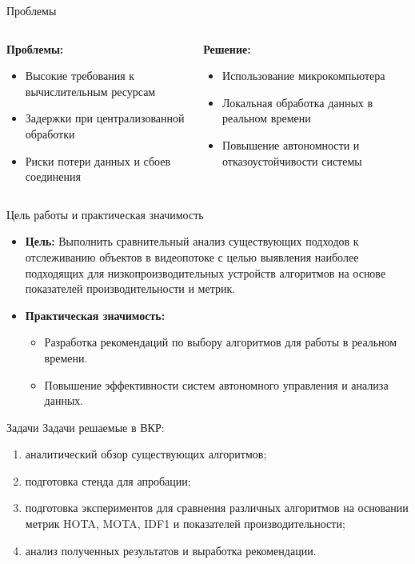 \documentclass{beamer} %
\begin{document}
\begin{frame}{Проблемы}
  \begin{columns}[T]
    \begin{column}{0.45\textwidth}
      \textbf{Проблемы:}
      \begin{itemize}
        \item Высокие требования к вычислительным ресурсам
        \item Задержки при централизованной обработки
        \item Риски потери данных и сбоев соединения
      \end{itemize}
    \end{column}
    \begin{column}{0.45\textwidth}
      \textbf{Решение:}
      \begin{itemize}
        \item Использование микрокомпьютера
        \item Локальная обработка данных в реальном времени
        \item Повышение автономности и отказоустойчивости системы
      \end{itemize}
    \end{column}
  \end{columns}
\end{frame}

\begin{frame}{Цель работы и практическая значимость}
  \begin{itemize}
    \item \textbf{Цель:} Выполнить сравнительный анализ существующих подходов к отслеживанию объектов в
    видеопотоке с целью выявления наиболее подходящих для низкопроизводительных
    устройств алгоритмов на основе показателей производительности и метрик.
    \item \textbf{Практическая значимость:}
      \begin{itemize}
        \item Разработка рекомендаций по выбору алгоритмов для работы в реальном времени.
        \item Повышение эффективности систем автономного управления и анализа данных.
      \end{itemize}
  \end{itemize}
\end{frame}

\begin{frame}{Задачи}
  Задачи решаемые в ВКР:
  \begin{enumerate}
    \item аналитический обзор существующих алгоритмов;
    \item подготовка стенда для апробации;
    \item подготовка экспериментов для сравнения различных алгоритмов на основании метрик HOTA, MOTA, IDF1 и показателей производительности;
    \item анализ полученных результатов и выработка рекомендации.
\end{enumerate}
\end{frame}
\end{document}
